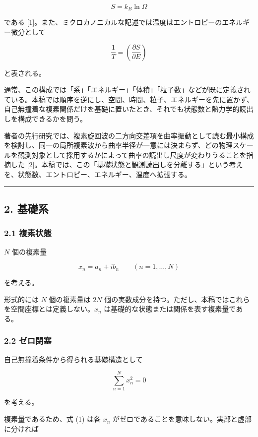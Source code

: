 \documentclass[
  a4paper,
]{ltjsarticle}
\begin{document}
\[
S=k_B\ln\Omega
\]

である
{[}1{]}。また、ミクロカノニカルな記述では温度はエントロピーのエネルギー微分として

\[
\frac{1}{T}
=
\left(\frac{\partial S}{\partial E}\right)
\]

と表される。

通常、この構成では「系」「エネルギー」「体積」「粒子数」などが既に定義されている。本稿では順序を逆にし、空間、時間、粒子、エネルギーを先に置かず、自己無撞着な複素関係だけを基礎に置いたとき、それでも状態数と熱力学的読出しを構成できるかを問う。

著者の先行研究では、複素旋回波の二方向交差項を曲率振動として読む最小構成を検討し、同一の局所複素波から曲率半径が一意には決まらず、どの物理スケールを観測対象として採用するかによって曲率の読出し尺度が変わりうることを指摘した
{[}2{]}。本稿では、この「基礎状態と観測読出しを分離する」という考えを、状態数、エントロピー、エネルギー、温度へ拡張する。

\begin{center}\rule{0.5\linewidth}{0.5pt}\end{center}

\subsection{2. 基礎系}\label{ux57faux790eux7cfb}

\subsubsection{2.1 複素状態}\label{ux8907ux7d20ux72b6ux614b}

\(N\) 個の複素量

\[
x_n=a_n+i b_n
\qquad
(n=1,\ldots,N)
\]

を考える。

形式的には \(N\) 個の複素量は \(2N\)
個の実数成分を持つ。ただし、本稿ではこれらを空間座標とは定義しない。\(x_n\)
は基礎的な状態または関係を表す複素量である。

\subsubsection{2.2 ゼロ閉塞}\label{ux30bcux30edux9589ux585e}

自己無撞着条件から得られる基礎構造として

\[
\sum_{n=1}^{N}x_n^2=0
\tag{1}
\]

を考える。

複素量であるため、式 (1) は各 \(x_n\)
がゼロであることを意味しない。実部と虚部に分ければ
\end{document}
